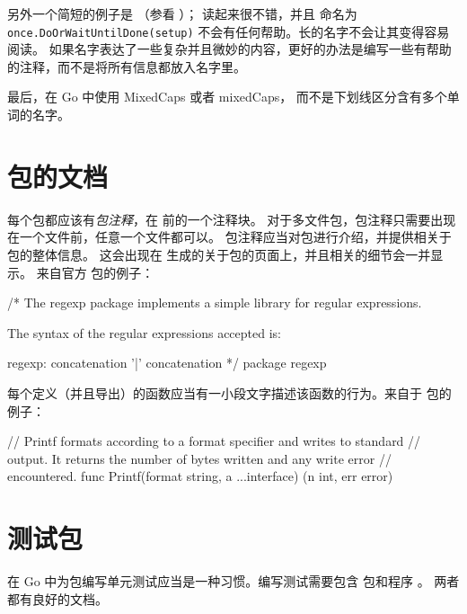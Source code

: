 另外一个简短的例子是 （参看 ）； 读起来很不错，并且
命名为 \lstinline{once.DoOrWaitUntilDone(setup)} 不会有任何帮助。长的名字不会让其变得容易阅读。
如果名字表达了一些复杂并且微妙的内容，更好的办法是编写一些有帮助的注释，而不是将所有信息都放入名字里。

最后，在 Go 中使用 MixedCaps 或者 mixedCaps，
而不是下划线区分含有多个单词的名字。


\section{包的文档}
每个包都应该有\emph{包注释}，在  前的一个注释块。
对于多文件包，包注释只需要出现在一个文件前，任意一个文件都可以。
包注释应当对包进行介绍，并提供相关于包的整体信息。
这会出现在  生成的关于包的页面上，并且相关的细节会一并显示。
来自官方  包的例子：
\begin{display}
/*
    The regexp package implements a simple library for
    regular expressions.

    The syntax of the regular expressions accepted is:

    regexp:
        concatenation { '|' concatenation }
*/
package regexp
\end{display}

每个定义（并且导出）的函数应当有一小段文字描述该函数的行为。来自于
  包的例子：
\begin{display}
// Printf formats according to a format specifier and writes to standard
// output. It returns the number of bytes written and any write error
// encountered.
func Printf(format string, a ...interface{}) (n int, err error)
\end{display}

\section{测试包}
在 Go 中为包编写单元测试应当是一种习惯。编写测试需要包含
 包和程序 。
两者都有良好的文档。

